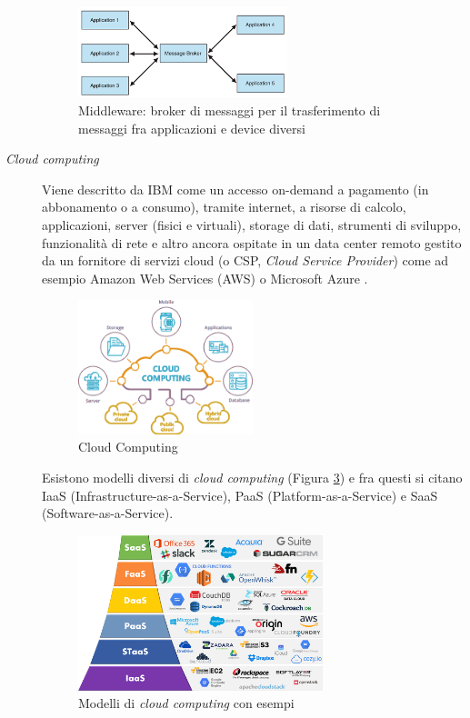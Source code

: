 \begin{description}
    \begin{figure} [h]
        \centering
        \includegraphics[width=0.6\textwidth]{img/message-broker.png}
        \caption{Middleware: broker di messaggi per il trasferimento di messaggi fra applicazioni e device diversi}
        \label{fig:broker}
    \end{figure}

    \item [\textit{Cloud computing}] Viene descritto da IBM \cite{ibm_cloudcomputing} come un accesso on-demand a pagamento (in abbonamento o a consumo), tramite internet, a risorse di calcolo, applicazioni, server (fisici e virtuali), storage di dati, strumenti di sviluppo, funzionalità di rete e altro ancora ospitate in un data center remoto gestito da un fornitore di servizi cloud (o CSP, \textit{Cloud Service Provider}) come ad esempio Amazon Web Services (AWS) o Microsoft Azure \cite{azure}.
    \begin{figure} [h]
        \centering
        \includegraphics[width=0.5\textwidth]{img/cloud-computing-services.png}
        \caption{Cloud Computing}
        \label{fig:cloudcomputing}
    \end{figure}
    Esistono modelli diversi di \textit{cloud computing} (Figura \ref{fig:cloudcomp-models}) e fra questi si citano IaaS (Infrastructure-as-a-Service), PaaS (Platform-as-a-Service) e SaaS (Software-as-a-Service).

    \begin{figure} [h]
        \centering
        \includegraphics[width=0.7\textwidth]{img/cloud-computing-models.png}
        \caption{Modelli di \textit{cloud computing} con esempi}
        \label{fig:cloudcomp-models}
    \end{figure}


\end{description}

